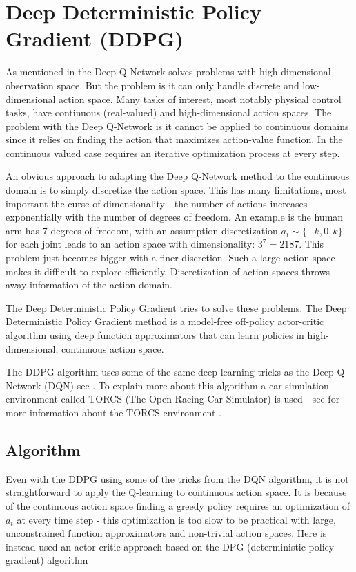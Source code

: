 \section{Deep Deterministic Policy Gradient (DDPG)}\label{DDPG}
As mentioned in  the Deep Q-Network solves problems with high-dimensional observation space. But the problem is it can only handle discrete and low-dimensional action space. Many tasks of interest, most notably physical control tasks, have continuous (real-valued) and high-dimensional action spaces. The problem with the Deep Q-Network is it cannot be applied to continuous domains since it relies on finding the action that maximizes action-value function. In the continuous valued case requires an iterative optimization process at every step. \cite{DBLP:journals/corr/LillicrapHPHETS15}

An obvious approach to adapting the Deep Q-Network method to the continuous domain is to simply discretize the action space. This has many limitations, most important the curse of dimensionality - the number of actions increases exponentially with the number of degrees of freedom. An example is the human arm has 7 degrees of freedom, with an assumption discretization $a_i \sim  \{-k,0,k\}$ for each joint leads to an action space with dimensionality: $3^7 = 2187$. This problem just becomes bigger with a finer discretion. Such a large action space makes it difficult to explore efficiently. Discretization of action spaces throws away information of the action domain.

The Deep Deterministic Policy Gradient tries to solve these problems. The Deep Deterministic Policy Gradient method is a model-free off-policy actor-critic algorithm using deep function approximators that can learn policies in high-dimensional, continuous action space. 

The DDPG algorithm uses some of the same deep learning tricks as the Deep Q-Network (DQN) see . To explain more about this algorithm a car simulation environment called TORCS (The Open Racing Car Simulator) is used - see  for more information about the TORCS environment \cite{DDPG_Torcs}.


\subsection{Algorithm}
Even with the DDPG using some of the tricks from the DQN algorithm, it is not straightforward to apply the Q-learning to continuous action space. It is because of the continuous action space finding a greedy policy requires an optimization of \textit{$a_t$} at every time step - this optimization is too slow to be practical with large, unconstrained function approximators and non-trivial action spaces. Here is instead used an actor-critic approach based on the DPG (deterministic policy gradient) algorithm \cite{DBLP:conf/icml/SilverLHDWR14} 


